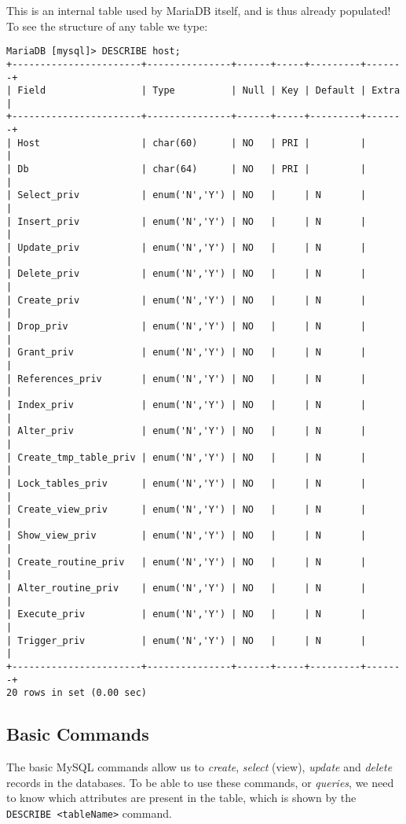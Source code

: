 \noindent
This is an internal table used by MariaDB itself, and is thus already populated! To see the structure of any table we type:

\vspace{-15pt}
\begin{verbatim}
MariaDB [mysql]> DESCRIBE host;
+-----------------------+---------------+------+-----+---------+-------+
| Field                 | Type          | Null | Key | Default | Extra |
+-----------------------+---------------+------+-----+---------+-------+
| Host                  | char(60)      | NO   | PRI |         |       |
| Db                    | char(64)      | NO   | PRI |         |       |
| Select_priv           | enum('N','Y') | NO   |     | N       |       |
| Insert_priv           | enum('N','Y') | NO   |     | N       |       |
| Update_priv           | enum('N','Y') | NO   |     | N       |       |
| Delete_priv           | enum('N','Y') | NO   |     | N       |       |
| Create_priv           | enum('N','Y') | NO   |     | N       |       |
| Drop_priv             | enum('N','Y') | NO   |     | N       |       |
| Grant_priv            | enum('N','Y') | NO   |     | N       |       |
| References_priv       | enum('N','Y') | NO   |     | N       |       |
| Index_priv            | enum('N','Y') | NO   |     | N       |       |
| Alter_priv            | enum('N','Y') | NO   |     | N       |       |
| Create_tmp_table_priv | enum('N','Y') | NO   |     | N       |       |
| Lock_tables_priv      | enum('N','Y') | NO   |     | N       |       |
| Create_view_priv      | enum('N','Y') | NO   |     | N       |       |
| Show_view_priv        | enum('N','Y') | NO   |     | N       |       |
| Create_routine_priv   | enum('N','Y') | NO   |     | N       |       |
| Alter_routine_priv    | enum('N','Y') | NO   |     | N       |       |
| Execute_priv          | enum('N','Y') | NO   |     | N       |       |
| Trigger_priv          | enum('N','Y') | NO   |     | N       |       |
+-----------------------+---------------+------+-----+---------+-------+
20 rows in set (0.00 sec)
\end{verbatim}
\vspace{-10pt}	

\subsection{Basic Commands}
The basic MySQL commands allow us to \textit{create}, \textit{select} (view), \textit{update} and \textit{delete} records in the databases. To be able to use these commands, or \textit{queries}, we need to know which attributes are present in the table, which is shown by the \verb|DESCRIBE <tableName>| command. 

